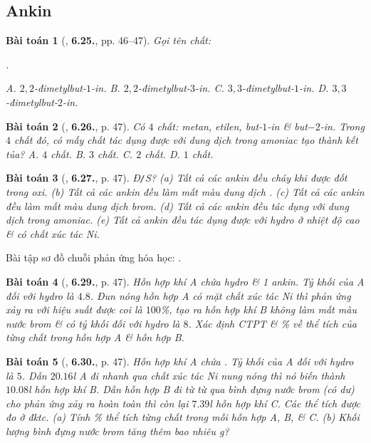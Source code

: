 \documentclass{article}
\numberwithin{equation}{section}
\newtheorem{baitoan}{Bài toán}[section]
\begin{document}

\subsection{Ankin}

\begin{baitoan}[\cite{SBT_Hoa_Hoc_11_co_ban}, \textbf{6.25.}, pp. 46--47]
	Gọi tên chất:
	\begin{center}
		.
	\end{center}
	{\sf A.} $2,2$-đimetylbut-$1$-in. {\sf B.} $2,2$-đimetylbut-$3$-in. {\sf C.} $3,3$-đimetylbut-$1$-in. {\sf D.} $3,3$-đimetylbut-$2$-in.
\end{baitoan}

\begin{baitoan}[\cite{SBT_Hoa_Hoc_11_co_ban}, \textbf{6.26.}, p. 47]
	Có $4$ chất: metan, etilen, but-$1$-in \& but$-2$-in. Trong $4$ chất đó, có mấy chất tác dụng được với dung dịch \emph{} trong amoniac tạo thành kết tủa? {\sf A.} $4$ chất. {\sf B.} $3$ chất. {\sf C.} $2$ chất. {\sf D.} $1$ chất.
\end{baitoan}

\begin{baitoan}[\cite{SBT_Hoa_Hoc_11_co_ban}, \textbf{6.27.}, p. 47]
	\emph{Đ\texttt{/}S?} (a) Tất cả các ankin đều cháy khi được đốt trong oxi. (b) Tất cả các ankin đều làm mất màu dung dịch \emph{}. (c) Tất cả các ankin đều làm mất màu dung dịch brom. (d) Tất cả các ankin đều tác dụng với dung dịch \emph{} trong amoniac. (e) Tất cả ankin đều tác dụng được với hydro ở nhiệt độ cao \& có chất xúc tác \emph{Ni}.
\end{baitoan}
Bài tập sơ đồ chuỗi phản ứng hóa học: \cite[\textbf{6.28.}, p. 47]{SBT_Hoa_Hoc_11_co_ban}.

\begin{baitoan}[\cite{SBT_Hoa_Hoc_11_co_ban}, \textbf{6.29.}, p. 47]
	Hỗn hợp khí A chứa hydro \& 1 ankin. Tỷ khối của A đối với hydro là $4.8$. Đun nóng hỗn hợp A có mặt chất xúc tác \emph{Ni} thì phản ứng xảy ra với hiệu suất được coi là $100$\%, tạo ra hỗn hợp khí B không làm mất màu nước brom \& có tỷ khối đối với hydro là $8$. Xác định CTPT \& \% về thể tích của từng chất trong hỗn hợp A \& hỗn hợp B.
\end{baitoan}

\begin{baitoan}[\cite{SBT_Hoa_Hoc_11_co_ban}, \textbf{6.30.}, p. 47]
	Hỗn hợp khí A chứa \emph{}. Tỷ khối của A đối với hydro là $5$. Dẫn $20.16$\emph{l} A đi nhanh qua chất xúc tác \emph{Ni} nung nóng thì nó biến thành $10.08$\emph{l} hỗn hợp khí B. Dẫn hỗn hợp B đi từ từ qua bình đựng nước brom (có dư) cho phản ứng xảy ra hoàn toàn thì còn lại $7.39$\emph{l} hỗn hợp khí C. Các thể tích được đo ở đktc. (a) Tính \% thể tích từng chất trong mỗi hỗn hợp A, B, \& C. (b) Khối lượng bình đựng nước brom tăng thêm bao nhiêu \emph{g}?
\end{baitoan}
\end{document}
